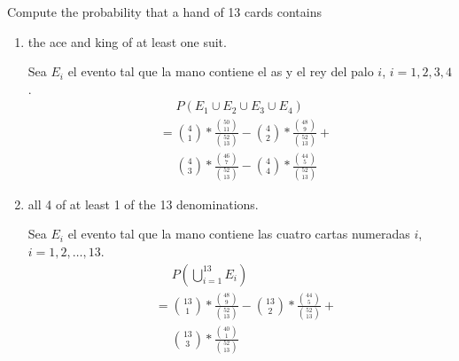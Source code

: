 \item Compute the probability that a hand of 13 cards contains
\begin{enumerate}
    \item the ace and king of at least one suit.

   Sea $E_i$ el evento tal que la mano contiene el as y el rey del palo $i$, $i = 1,2,3,4$.
    \begin{align*}
        &\phantom{{}={}} P(E_1\cup E_2\cup E_3\cup E_4)\\
        &= \binom{4}{1} * \frac{\binom{50}{11}}{\binom{52}{13}}
        -  \binom{4}{2} * \frac{\binom{48}{ 9}}{\binom{52}{13}} + {}\\
        &\phantom{{}={}}
           \binom{4}{3} * \frac{\binom{46}{ 7}}{\binom{52}{13}} -
           \binom{4}{4} * \frac{\binom{44}{ 5}}{\binom{52}{13}}
    \end{align*}
    \item all 4 of at least 1 of the 13 denominations.

    Sea $E_i$ el evento tal que la mano contiene las cuatro cartas numeradas $i$, $i = 1,2,\dots,13$.
    \begin{align*}
        &\phantom{{}={}} P(\textstyle \bigcup_{i=1}^{13} E_i)\\
        &= \binom{13}{1} * \frac{\binom{48}{9}}{\binom{52}{13}}
        -  \binom{13}{2} * \frac{\binom{44}{ 5}}{\binom{52}{13}} + {}\\
        &\phantom{{}={}}
           \binom{13}{3} * \frac{\binom{40}{ 1}}{\binom{52}{13}}
    \end{align*}
\end{enumerate}